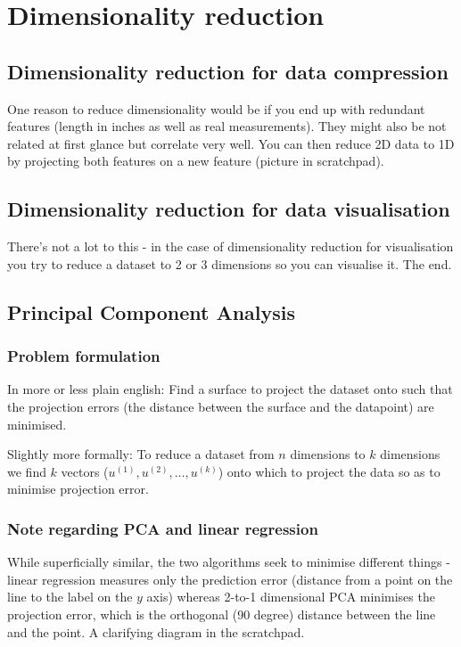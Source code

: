 \chapter{Dimensionality reduction}

\section{Dimensionality reduction for data compression}

One reason to reduce dimensionality would be if you end up with redundant features (length in inches as well as real measurements). They might also be not related at first glance but correlate very well. You can then reduce 2D data to 1D by projecting both features on a new feature (picture in scratchpad).

\section{Dimensionality reduction for data visualisation}

There's not a lot to this - in the case of dimensionality reduction for visualisation you try to reduce a dataset to 2 or 3 dimensions so you can visualise it. The end.

\section{Principal Component Analysis}

\subsection{Problem formulation}

In more or less plain english: Find a surface to project the dataset onto such that the projection errors (the distance between the surface and the datapoint) are minimised.

Slightly more formally: To reduce a dataset from $n$ dimensions to $k$ dimensions we find $k$ vectors ($u^{(1)}, u^{(2)}, \dots, u^{(k)}$) onto which to project the data so as to minimise projection error.

\subsection{Note regarding PCA and linear regression}

While superficially similar, the two algorithms seek to minimise different things - linear regression measures only the prediction error (distance from a point on the line to the label on the $y$ axis) whereas 2-to-1 dimensional PCA minimises the projection error, which is the orthogonal (90 degree) distance between the line and the point. A clarifying diagram in the scratchpad.

